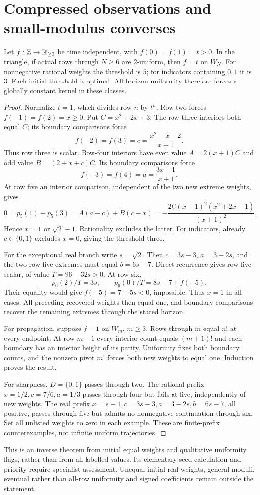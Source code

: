 \section{Compressed observations and small-modulus converses}\label{sec:compressed}
\begin{theorem}\label{thm:parity}
Let $f:\mathbb Z\to\mathbb R_{\ge0}$ be time independent, with $f(0)=f(1)=t>0$. In the triangle, if actual rows through $N\ge6$ are $2$-uniform, then $f=t$ on $W_N$. For nonnegative rational weights the threshold is $5$; for indicators containing $0,1$ it is $3$. Each initial threshold is optimal. All-horizon uniformity therefore forces a globally constant kernel in these classes.
\end{theorem}
\begin{proof}
Normalize $t=1$, which divides row $n$ by $t^n$. Row two forces $f(-1)=f(2)=x\ge0$. Put $C=x^2+2x+3$. The row-three interiors both equal $C$; its boundary comparisons force
\[
f(-2)=f(3)=c=\frac{x^2-x+2}{x+1}.
\]
Thus row three is scalar. Row-four interiors have even value $A=2(x+1)C$ and odd value $B=(2+x+c)C$. Its boundary comparisons force
\[
f(-3)=f(4)=a=\frac{3x-1}{x+1}.
\]
At row five an interior comparison, independent of the two new extreme weights, gives
\[
0=p_5(1)-p_5(3)=A(a-c)+B(c-x)
=-\frac{2C(x-1)^2(x^2+2x-1)}{(x+1)^2}.
\]
Hence $x=1$ or $\sqrt2-1$. Rationality excludes the latter. For indicators, already $c\in\{0,1\}$ excludes $x=0$, giving the threshold three.

For the exceptional real branch write $s=\sqrt2$. Then $c=3s-3$, $a=3-2s$, and the two row-five extremes must equal $b=6s-7$. Direct recurrence gives row five scalar, of value $T=96-32s>0$. At row six,
\[
p_6(2)/T=3s,\qquad p_6(0)/T=8s-7+f(-5).
\]
Their equality would give $f(-5)=7-5s<0$, impossible. Thus $x=1$ in all cases. All preceding recovered weights then equal one, and boundary comparisons recover the remaining extremes through the stated horizon.

For propagation, suppose $f=1$ on $W_m$, $m\ge3$. Rows through $m$ equal $n!$ at every endpoint. At row $m+1$ every interior count equals $(m+1)!$ and each boundary has an interior height of its parity. Uniformity fixes both boundary counts, and the nonzero pivot $m!$ forces both new weights to equal one. Induction proves the result.

For sharpness, $D=\{0,1\}$ passes through two. The rational prefix $x=1/2,c=7/6,a=1/3$ passes through four but fails at five, independently of new weights. The real prefix $x=s-1,c=3s-3,a=3-2s,b=6s-7$, all positive, passes through five but admits no nonnegative continuation through six. Set all unlisted weights to zero in each example. These are finite-prefix counterexamples, not infinite uniform trajectories.
\end{proof}
This is an inverse theorem from initial equal weights and qualitative uniformity flags, rather than from all labelled values. Its elementary seed calculation and priority require specialist assessment. Unequal initial real weights, general moduli, eventual rather than all-row uniformity and signed coefficients remain outside the statement.

